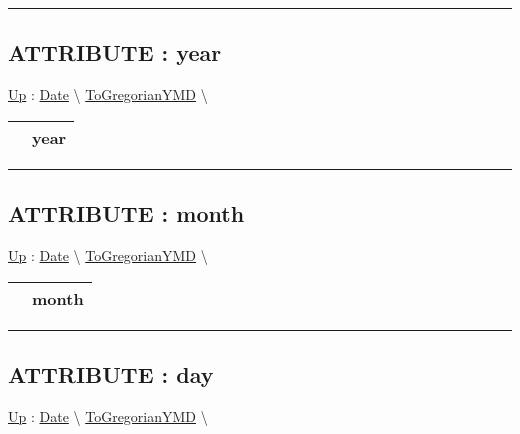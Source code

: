 \rule{\linewidth}{0.5pt}

\subsection*{ATTRIBUTE : year}
\hypertarget{ecldoc:date.togregorianymd.result.year}{}
\hyperlink{ecldoc:date.togregorianymd}{Up} :
\hspace{0pt} \hyperlink{ecldoc:Date}{Date} \textbackslash 
\hspace{0pt} \hyperlink{ecldoc:date.togregorianymd}{ToGregorianYMD} \textbackslash 

{\renewcommand{\arraystretch}{1.5}
\begin{tabularx}{\textwidth}{|>{\raggedright\arraybackslash}l|X|}
\hline
\hspace{0pt} & year \\
\hline
\end{tabularx}
}

\par


\rule{\linewidth}{0.5pt}
\subsection*{ATTRIBUTE : month}
\hypertarget{ecldoc:date.togregorianymd.result.month}{}
\hyperlink{ecldoc:date.togregorianymd}{Up} :
\hspace{0pt} \hyperlink{ecldoc:Date}{Date} \textbackslash 
\hspace{0pt} \hyperlink{ecldoc:date.togregorianymd}{ToGregorianYMD} \textbackslash 

{\renewcommand{\arraystretch}{1.5}
\begin{tabularx}{\textwidth}{|>{\raggedright\arraybackslash}l|X|}
\hline
\hspace{0pt} & month \\
\hline
\end{tabularx}
}

\par


\rule{\linewidth}{0.5pt}
\subsection*{ATTRIBUTE : day}
\hypertarget{ecldoc:date.togregorianymd.result.day}{}
\hyperlink{ecldoc:date.togregorianymd}{Up} :
\hspace{0pt} \hyperlink{ecldoc:Date}{Date} \textbackslash 
\hspace{0pt} \hyperlink{ecldoc:date.togregorianymd}{ToGregorianYMD} \textbackslash 

